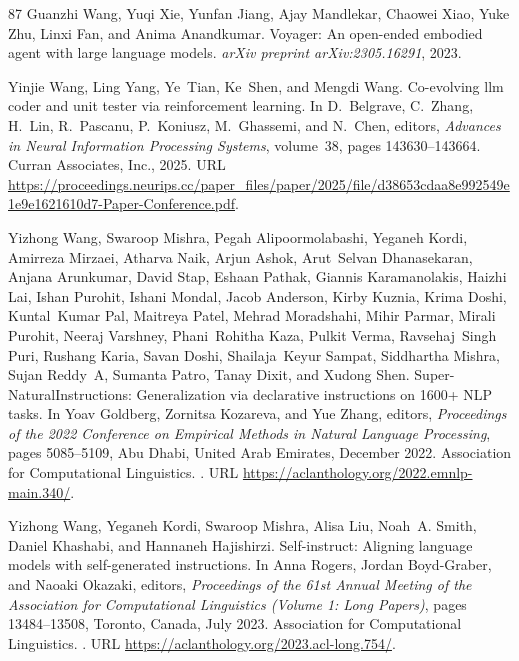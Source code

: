\begin{thebibliography}{87}
Guanzhi Wang, Yuqi Xie, Yunfan Jiang, Ajay Mandlekar, Chaowei Xiao, Yuke Zhu, Linxi Fan, and Anima Anandkumar.
\newblock Voyager: An open-ended embodied agent with large language models.
\newblock \emph{arXiv preprint arXiv:2305.16291}, 2023{}.

Yinjie Wang, Ling Yang, Ye~Tian, Ke~Shen, and Mengdi Wang.
\newblock Co-evolving llm coder and unit tester via reinforcement learning.
\newblock In D.~Belgrave, C.~Zhang, H.~Lin, R.~Pascanu, P.~Koniusz, M.~Ghassemi, and N.~Chen, editors, \emph{Advances in Neural Information Processing Systems}, volume~38, pages 143630--143664. Curran Associates, Inc., 2025{}.
\newblock URL \url{https://proceedings.neurips.cc/paper_files/paper/2025/file/d38653cdaa8e992549e1e9e1621610d7-Paper-Conference.pdf}.

Yizhong Wang, Swaroop Mishra, Pegah Alipoormolabashi, Yeganeh Kordi, Amirreza Mirzaei, Atharva Naik, Arjun Ashok, Arut~Selvan Dhanasekaran, Anjana Arunkumar, David Stap, Eshaan Pathak, Giannis Karamanolakis, Haizhi Lai, Ishan Purohit, Ishani Mondal, Jacob Anderson, Kirby Kuznia, Krima Doshi, Kuntal~Kumar Pal, Maitreya Patel, Mehrad Moradshahi, Mihir Parmar, Mirali Purohit, Neeraj Varshney, Phani~Rohitha Kaza, Pulkit Verma, Ravsehaj~Singh Puri, Rushang Karia, Savan Doshi, Shailaja~Keyur Sampat, Siddhartha Mishra, Sujan Reddy~A, Sumanta Patro, Tanay Dixit, and Xudong Shen.
\newblock Super-{N}atural{I}nstructions: Generalization via declarative instructions on 1600+ {NLP} tasks.
\newblock In Yoav Goldberg, Zornitsa Kozareva, and Yue Zhang, editors, \emph{Proceedings of the 2022 Conference on Empirical Methods in Natural Language Processing}, pages 5085--5109, Abu Dhabi, United Arab Emirates, December 2022. Association for Computational Linguistics.
\newblock {}.
\newblock URL \url{https://aclanthology.org/2022.emnlp-main.340/}.

Yizhong Wang, Yeganeh Kordi, Swaroop Mishra, Alisa Liu, Noah~A. Smith, Daniel Khashabi, and Hannaneh Hajishirzi.
\newblock Self-instruct: Aligning language models with self-generated instructions.
\newblock In Anna Rogers, Jordan Boyd-Graber, and Naoaki Okazaki, editors, \emph{Proceedings of the 61st Annual Meeting of the Association for Computational Linguistics (Volume 1: Long Papers)}, pages 13484--13508, Toronto, Canada, July 2023{}. Association for Computational Linguistics.
\newblock {}.
\newblock URL \url{https://aclanthology.org/2023.acl-long.754/}.


\end{thebibliography}
